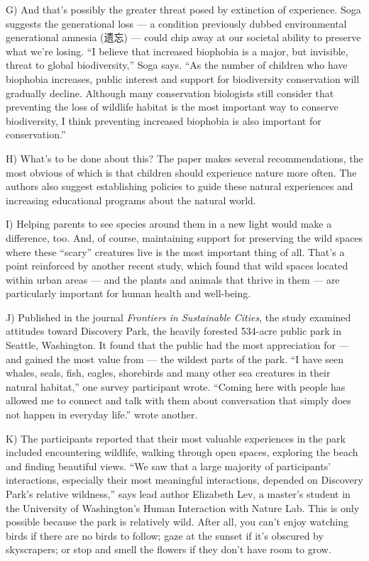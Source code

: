\documentclass[UTF8,11pt]{ctexart}
\begin{document}
G) And that’s possibly the greater threat posed by extinction of experience. Soga suggests the generational loss — a condition previously dubbed environmental generational amnesia (遗忘) — could chip away at our societal ability to preserve what we’re losing. “I believe that increased biophobia is a major, but invisible, threat to global biodiversity,” Soga says. “As the number of children who have biophobia increases, public interest and support for biodiversity conservation will gradually decline. Although many conservation biologists still consider that preventing the loss of wildlife habitat is the most important way to conserve biodiversity, I think preventing increased biophobia is also important for conservation.”


H) What’s to be done about this? The paper makes several recommendations, the most obvious of which is that children should experience nature more often. The authors also suggest establishing policies to guide these natural experiences and increasing educational programs about the natural world.


I) Helping parents to see species around them in a new light would make a difference, too. And, of course, maintaining support for preserving the wild spaces where these “scary” creatures live is the most important thing of all. That’s a point reinforced by another recent study, which found that wild spaces located within urban areas — and the plants and animals that thrive in them — are particularly important for human health and well-being.


J) Published in the journal \textit{Frontiers in Sustainable Cities}, the study examined attitudes toward Discovery Park, the heavily forested 534-acre public park in Seattle, Washington. It found that the public had the most appreciation for — and gained the most value from — the wildest parts of the park. “I have seen whales, seals, fish, eagles, shorebirds and many other sea creatures in their natural habitat,” one survey participant wrote. “Coming here with people has allowed me to connect and talk with them about conversation that simply does not happen in everyday life.” wrote another.


K) The participants reported that their most valuable experiences in the park included encountering wildlife, walking through open spaces, exploring the beach and finding beautiful views. “We saw that a large majority of participants’ interactions, especially their most meaningful interactions, depended on Discovery Park’s relative wildness,” says lead author Elizabeth Lev, a master’s student in the University of Washington’s Human Interaction with Nature Lab. This is only possible because the park is relatively wild. After all, you can’t enjoy watching birds if there are no birds to follow; gaze at the sunset if it’s obscured by skyscrapers; or stop and smell the flowers if they don’t have room to grow.
\end{document}
